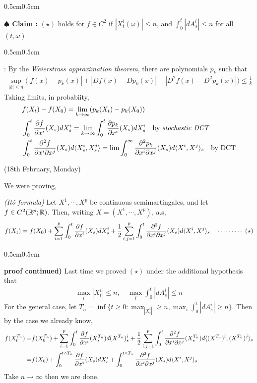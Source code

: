 \documentclass[12pt,a4paper]{article}
\newenvironment{proof}
{\begin{changemargin}{0.5cm}{0.5cm} 
	}%
	{\end{changemargin}
}
\newenvironment{subproof}
{\begin{changemargin}{0.5cm}{0.5cm} 
	}%
	{\end{changemargin}
}
\newenvironment{p}
{\begin{proof} 
	}%
	{\end{proof}
}
\begin{document}
\begin{p}
\textbf{$\spadesuit$ Claim :} $(\star)$ holds for $f\in C^2$ if $|X_t^i (\omega)|\leq n$, and $\int_0^t |dA_s^i| \leq n$ for all $(t, \omega)$.
\begin{subproof}
: By the \emph{Weierstrass approximation theorem}, there are polynomials $p_k$ such that
\begin{align*}
\sup_{|k| \leq n} \Big(|f(x) - p_k(x)| + |D f(x) - D p_k(x)|+ |D^2 f(x) - D^2 p_k(x)| \Big) \leq \frac{1}{k}
\end{align*}
Taking limits, in probabiity,
\begin{align*}
& f(X_t) - f(X_0) = \lim_{k\rightarrow \infty} (p_k(X_t) - p_k(X_0))\\
& \int_0^t \frac{\partial f}{\partial x^i} (X_s) dX_s^i = \lim_{k\rightarrow \infty} \int_0^t \frac{\partial p_k}{\partial x^i}(X_s) dX_s^i \quad \text{by } \emph{stochastic DCT}\\
& \int_0^t \frac{\partial^2 f}{\partial x^i \partial x^j}(X_s)d\langle X_s^i, X_s^j \rangle = \lim \int_0^\infty \frac{\partial^2 p_k}{\partial x^i \partial x^j}(X_s) d\langle X^i, X^j \rangle_s \quad \text{by DCT}
\end{align*}
\end{subproof}

\end{p}
\s

\newday

(18th February, Monday)
\s

We were proving,

\thm \emph{(It\^o formula)} Let $X^1, \cdots, X^p$ be continuous semimartingales, and let $f \in C^2(\mathbb{R}^p ; \mathbb{R})$. Then, writing $X = (X^1, \cdots, X^p)$, a.s,
\begin{align*}
f(X_t) =  f(X_0) + \sum_{i=1}^p \int_0^t \frac{\partial f}{\partial x^i}(X_s)dX_s^i + \frac{1}{2} \sum_{i,j=1}^p \int_0^t \frac{\partial^2 f}{\partial x^i \partial x^j} (X_s) d\langle X^i, X^j \rangle_s \quad \cdots\cdots\cdots\,\,(\star)
\end{align*}
\begin{p}
\textbf{proof continued)} Last time we proved $(\star)$ under the additional hypothesis that
\begin{align*}
\max_i |X_t^i| \leq n, \quad \max_{i} \int_0^t |dA_s^i| \leq n
\end{align*}
For the general case, let $T_n = \inf \{t\geq 0 : \max_ |X_t^i| \geq n, \max_i \int_0^t |dA_s^i| \geq n\}$. Then by the case we already know,
\begin{align*}
f(X_t^{T_n}) =& f(X_0^{T_n}) + \sum_{i=1}^{p} \int_0^t \frac{\partial f}{\partial x^i} (X_s^{T_n}) d(X^{T_n})_s^i + \frac{1}{2} \sum_{i,j=1}^p \int_0^t \frac{\partial^2 f}{\partial x^i \partial x^j} (X_s^{T_n}) d\langle (X^{T_n})^i, (X^{T_n})^j \rangle_s \\
=& f(X_0) + \int_0^{t\wedge T_n} \frac{\partial f}{\partial x^i} (X_s) dX_s^i + \int_0^{t\wedge T_n} \frac{\partial^2 f}{\partial x^i \partial x^j} (X_s) d\langle X^i, X^j \rangle_s
\end{align*}
Take $n\rightarrow\infty$ then we are done.

\eop
\end{p}
\s
\end{document}
